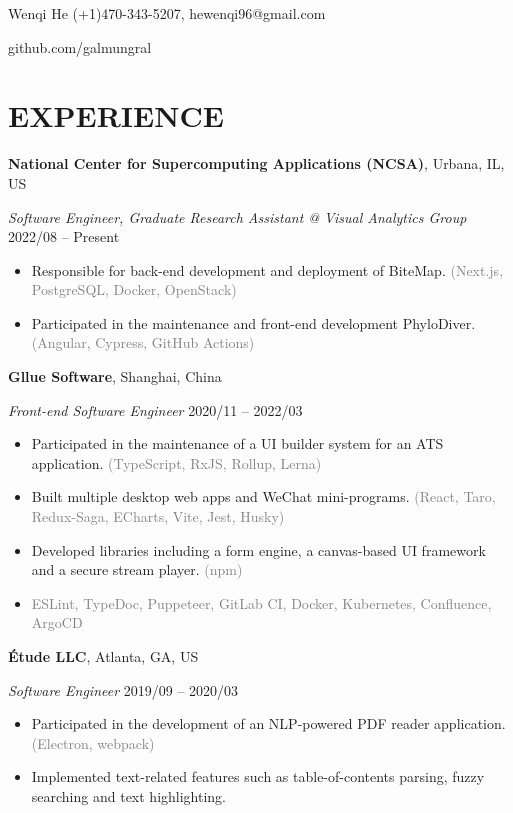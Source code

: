 \documentclass[10pt]{article}
\begin{document}
{\huge Wenqi He} \hfill (+1)470-343-5207, hewenqi96@gmail.com

\hfill github.com/galmungral

\section*{EXPERIENCE}
\textbf{National Center for Supercomputing Applications (NCSA)}, Urbana, IL, US

\textit{Software Engineer, Graduate Research Assistant @ Visual Analytics Group} \hfill 2022/08 -- Present

\begin{itemize}[itemsep=0pt, topsep=4pt, label=-]
\item Responsible for back-end development and deployment of BiteMap. \textcolor{gray}{(Next.js, PostgreSQL, Docker, OpenStack)}
\item Participated in the maintenance and front-end development PhyloDiver. \textcolor{gray}{(Angular, Cypress, GitHub Actions)}
\end{itemize}

\vspace{0.5em}
\textbf{Gllue Software}, Shanghai, China

\textit{Front-end Software Engineer}  \hfill 2020/11 -- 2022/03

\begin{itemize}[itemsep=0pt, topsep=4pt, label=-]
\item Participated in the maintenance of a UI builder system for an ATS application. \textcolor{gray}{(TypeScript, RxJS, Rollup, Lerna)}
\item Built multiple desktop web apps and WeChat mini-programs. \textcolor{gray}{(React, Taro, Redux-Saga, ECharts, Vite, Jest, Husky)}
\item Developed libraries including a form engine, a canvas-based UI framework and a secure stream player. \textcolor{gray}{(npm)}
\item \textcolor{gray}{ESLint, TypeDoc, Puppeteer, GitLab CI, Docker, Kubernetes, Confluence, ArgoCD}
\end{itemize}
\vspace{0.5em}
\textbf{Étude LLC}, Atlanta, GA, US

\textit{Software Engineer} \hfill 2019/09 -- 2020/03

\begin{itemize}[itemsep=0pt, topsep=4pt, label=-]
\item Participated in the development of an NLP-powered PDF reader application. \textcolor{gray}{(Electron, webpack)}
\item Implemented text-related features such as table-of-contents parsing, fuzzy searching and text highlighting.
\end{itemize}
\end{document}
